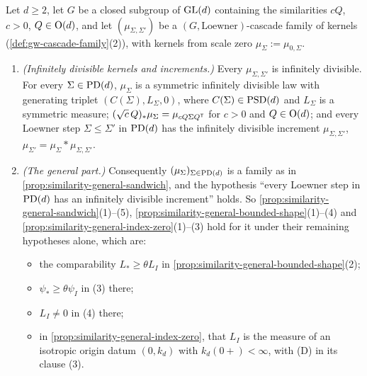\begin{proposition}
\label{prop:similarity-cascade-families}
\leanok
Let $d \ge 2$, let $G$ be a closed subgroup of $\mathrm{GL}(d)$ containing the similarities $cQ$, $c > 0$,
$Q \in \mathrm{O}(d)$, and let $(\mu_{\Sigma,\Sigma'})$ be a $(G, \text{Loewner})$-cascade family of kernels
(\ref{def:gw-cascade-family}(2)), with kernels from scale zero $\mu_\Sigma := \mu_{0,\Sigma}$.
\begin{enumerate}
\item \emph{(Infinitely divisible kernels and increments.)} Every $\mu_{\Sigma,\Sigma'}$ is infinitely divisible. For
every $\Sigma \in \mathrm{PD}(d)$, $\mu_\Sigma$ is a symmetric infinitely divisible law with generating triplet
$(C(\Sigma), L_\Sigma, 0)$, where $C(\Sigma) \in \mathrm{PSD}(d)$ and $L_\Sigma$ is a symmetric \Levy{} measure;
$(\sqrt c\,Q)_*\mu_\Sigma = \mu_{cQ\Sigma Q^{\mathsf{T}}}$ for $c > 0$ and $Q \in \mathrm{O}(d)$; and every Loewner
step $\Sigma \le \Sigma'$ in $\mathrm{PD}(d)$ has the infinitely divisible increment $\mu_{\Sigma,\Sigma'}$,
$\mu_{\Sigma'} = \mu_\Sigma * \mu_{\Sigma,\Sigma'}$.
\item \emph{(The general part.)} Consequently $(\mu_\Sigma)_{\Sigma \in \mathrm{PD}(d)}$ is a family as in
\ref{prop:similarity-general-sandwich}, and the hypothesis ``every Loewner step in $\mathrm{PD}(d)$ has an
infinitely divisible increment'' holds. So \ref{prop:similarity-general-sandwich}(1)--(5),
\ref{prop:similarity-general-bounded-shape}(1)--(4) and \ref{prop:similarity-general-index-zero}(1)--(3)
hold for it under their remaining hypotheses alone, which are:
\begin{itemize}
\item the comparability $L_* \ge \theta L_I$ in \ref{prop:similarity-general-bounded-shape}(2);
\item $\psi_* \ge \theta\psi_I$ in (3) there;
\item $L_I \ne 0$ in (4) there;
\item in \ref{prop:similarity-general-index-zero}, that $L_I$ is the \Levy{} measure of an isotropic
origin datum $(0, k_d)$ with $k_d(0{+}) < \infty$, with (D) in its clause (3).

\end{itemize}
\end{enumerate}
\end{proposition}

